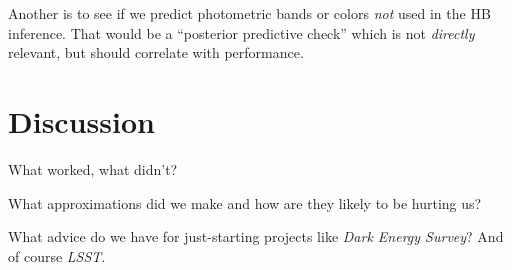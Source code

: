 \documentclass[12pt]{article}
\newcommand{\project}[1]{\textsl{#1}}
\begin{document}
Another is to see if we predict photometric bands or colors \emph{not}
used in the HB inference.  That would be a ``posterior predictive
check'' which is not \emph{directly} relevant, but should correlate
with performance.

\section{Discussion}

What worked, what didn't?

What approximations did we make and how are they likely to be hurting
us?

What advice do we have for just-starting projects like \project{Dark
  Energy Survey}?  And of course \project{LSST}.
\end{document}
